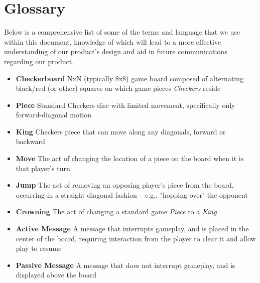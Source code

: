 \documentclass[letterpaper]{article}
\begin{document}

\newpage

\section{Glossary}
\label{sec:glossary}

Below is a comprehensive list of some of the terms and language
that we use within this document, knowledge of which will lead
to a more effective understanding of our product's design and
aid in future communications regarding our product.

\begin{itemize}
    \item \textbf{Checkerboard} NxN (typically 8x8) game board
          composed of alternating black/red (or other) squares
          on which game pieces \emph{Checkers} reside
    \item \textbf{Piece} Standard Checkers disc with limited
          movement, specifically only forward-diagonal motion
    \item \textbf{King} Checkers piece that can move along any
          diagonals, forward or backward
    \item \textbf{Move} The act of changing the location of a
          piece on the board when it is that player's turn
    \item \textbf{Jump} The act of removing an opposing player's
          piece from the board, occurring in a straight diagonal
          fashion -- e.g., "hopping over" the opponent
    \item \textbf{Crowning} The act of changing a standard
          game \emph{Piece} to a \emph{King}
    \item \textbf{Active Message} A message that interrupts gameplay,
    	  and is placed in the center of the board, requiring 
          interaction from the player to clear it and allow play
          to resume
    \item \textbf{Passive Message} A message that does not interrupt
    	  gameplay, and is displayed above the board
\end{itemize}

\end{document}
